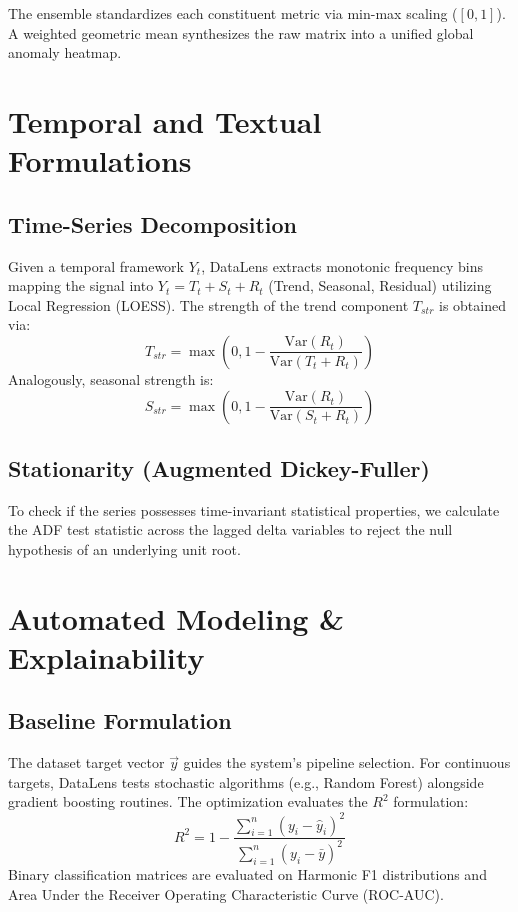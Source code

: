 \documentclass[conference]{IEEEtran}
\begin{document}
The ensemble standardizes each constituent metric via min-max scaling ($[0,1]$). A weighted geometric mean synthesizes the raw matrix into a unified global anomaly heatmap.

\section{Temporal and Textual Formulations}\label{sec:timetext}

\subsection{Time-Series Decomposition}
Given a temporal framework $Y_t$, DataLens extracts monotonic frequency bins mapping the signal into $Y_t = T_t + S_t + R_t$ (Trend, Seasonal, Residual) utilizing Local Regression (LOESS). 
The strength of the trend component $T_{str}$ is obtained via:
\begin{equation}
    T_{str} = \max\left(0, 1 - \frac{\mathrm{Var}(R_t)}{\mathrm{Var}(T_t + R_t)}\right)
\end{equation}
Analogously, seasonal strength is:
\begin{equation}
    S_{str} = \max\left(0, 1 - \frac{\mathrm{Var}(R_t)}{\mathrm{Var}(S_t + R_t)}\right)
\end{equation}

\subsection{Stationarity (Augmented Dickey-Fuller)}
To check if the series possesses time-invariant statistical properties, we calculate the ADF test statistic across the lagged delta variables to reject the null hypothesis of an underlying unit root.

\section{Automated Modeling \& Explainability}\label{sec:modeling}

\subsection{Baseline Formulation}
The dataset target vector $\vec{y}$ guides the system's pipeline selection.
For continuous targets, DataLens tests stochastic algorithms (e.g., Random Forest) alongside gradient boosting routines. The optimization evaluates the $R^2$ formulation:
\begin{equation}
    R^2 = 1 - \frac{\sum_{i=1}^n (y_i - \hat{y}_i)^2}{\sum_{i=1}^n (y_i - \bar{y})^2}
\end{equation}
Binary classification matrices are evaluated on Harmonic F1 distributions and Area Under the Receiver Operating Characteristic Curve (ROC-AUC).
\end{document}
